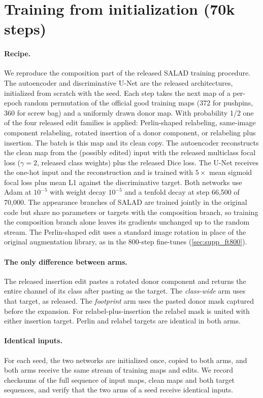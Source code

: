 \section{Training from initialization (70k steps)}
\label{sec:supp_scratch}
\paragraph{Recipe.} We reproduce the composition part of the released SALAD training procedure. The autoencoder and discriminative U-Net are the released architectures, initialized from scratch with the seed. Each step takes the next map of a per-epoch random permutation of the official good training maps (372 for pushpins, 360 for screw bag) and a uniformly drawn donor map. With probability 1/2 one of the four released edit families is applied: Perlin-shaped relabeling, same-image component relabeling, rotated insertion of a donor component, or relabeling plus insertion. The batch is this map and its clean copy. The autoencoder reconstructs the clean map from the (possibly edited) input with the released multiclass focal loss ($\gamma=2$, released class weights) plus the released Dice loss. The U-Net receives the one-hot input and the reconstruction and is trained with $5\times$ mean sigmoid focal loss plus mean L1 against the discriminative target. Both networks use Adam at $10^{-5}$ with weight decay $10^{-5}$ and a tenfold decay at step 66{,}500 of 70{,}000. The appearance branches of SALAD are trained jointly in the original code but share no parameters or targets with the composition branch, so training the composition branch alone leaves its gradients unchanged up to the random stream. The Perlin-shaped edit uses a standard image rotation in place of the original augmentation library, as in the 800-step fine-tunes (\cref{sec:supp_ft800}).
\paragraph{The only difference between arms.} The released insertion edit pastes a rotated donor component and returns the entire channel of its class after pasting as the target. The \emph{class-wide} arm uses that target, as released. The \emph{footprint} arm uses the pasted donor mask captured before the expansion. For relabel-plus-insertion the relabel mask is united with either insertion target. Perlin and relabel targets are identical in both arms.
\paragraph{Identical inputs.} For each seed, the two networks are initialized once, copied to both arms, and both arms receive the same stream of training maps and edits. We record checksums of the full sequence of input maps, clean maps and both target sequences, and verify that the two arms of a seed receive identical inputs.
